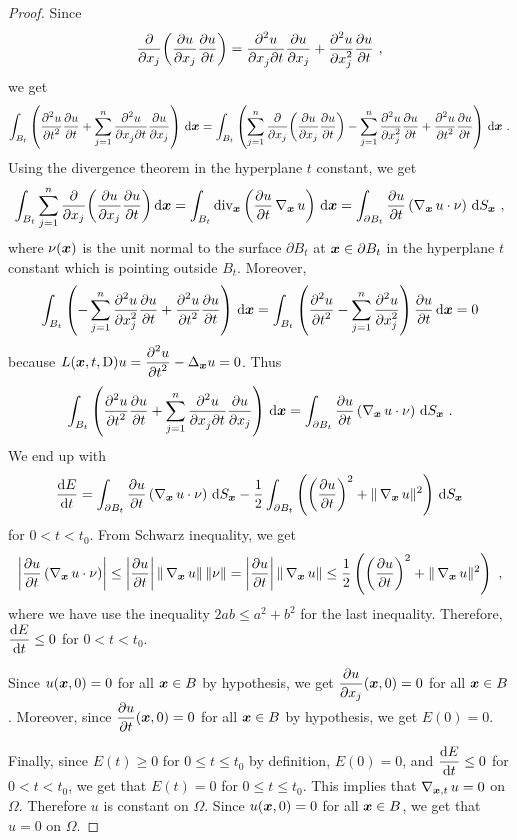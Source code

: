 \begin{proof}
Since
\[
\pdfdx{ \left( \pdydx{u}{x_j} \pdydx{u}{t} \right) }{x_j}
= \pdydxnm{u}{x_j}{t}{2}{}{} \pdydx{u}{x_j} + \pdydxn{u}{x_j}{2}
\pdydx{u}{t} \ ,
\]
we get
\[
\int_{B_t} \left( \pdydxn{u}{t}{2} \pdydx{u}{t} +
\sum_{j=1}^n \pdydxnm{u}{x_j}{t}{2}{}{} \pdydx{u}{x_j} \right)
\dx{\VEC{x}}
= \int_{B_t} \left( \sum_{j=1}^n
\pdfdx{ \left( \pdydx{u}{x_j} \pdydx{u}{t} \right) }{x_j}
- \sum_{j=1}^n \pdydxn{u}{x_j}{2} \pdydx{u}{t} + 
\pdydxn{u}{t}{2} \pdydx{u}{t} \right) \dx{\VEC{x}} \ .
\]
Using the divergence theorem in the hyperplane $t$ constant, we get
\[
\int_{B_t} \sum_{j=1}^n
\pdfdx{ \left( \pdydx{u}{x_j} \pdydx{u}{t} \right) }{x_j} \dx{\VEC{x}}
= \int_{B_t} \diV_\VEC{x} \left( \pdydx{u}{t} \graD_{\VEC{x}} u \right)
\dx{\VEC{x}}
= \int_{\partial B_t} \pdydx{u}{t} \left( \graD_{\VEC{x}} u \cdot
\nu \right) \dss{S}{x} \  ,
\]
where $\nu(\VEC{x})$ is the unit normal to the surface
$\partial B_t$ at $\VEC{x} \in \partial B_t$ in the hyperplane $t$
constant which is pointing outside $B_t$.
Moreover,
\[
\int_{B_t} \left( - \sum_{j=1}^n \pdydxn{u}{x_j}{2} \pdydx{u}{t} + 
\pdydxn{u}{t}{2} \pdydx{u}{t} \right) \dx{\VEC{x}} =
\int_{B_t} \left( \pdydxn{u}{t}{2} -
\sum_{j=1}^n \pdydxn{u}{x_j}{2} \right) \pdydx{u}{t} \dx{\VEC{x}} = 0
\]
because
$\displaystyle L(\VEC{x},t,\diff) u = \pdydxn{u}{t}{2} -
\Delta_{\VEC{x}} u = 0$.
Thus
\[
\int_{B_t} \left( \pdydxn{u}{t}{2} \pdydx{u}{t} +
\sum_{j=1}^n \pdydxnm{u}{x_j}{t}{2}{}{} \pdydx{u}{x_j} \right)
\dx{\VEC{x}} =
\int_{\partial B_t} \pdydx{u}{t} \left( \graD_{\VEC{x}} u \cdot
\nu \right) \dss{S}{x} \ .
\]
We end up with
\[
\dydx{E}{t} = \int_{\partial B_t} \pdydx{u}{t} \left( \graD_{\VEC{x}} u \cdot
\nu \right) \dss{S}{x}
- \frac{1}{2} \int_{\partial B_t} \left( \left(\pdydx{u}{t}\right)^2 
+ \|\graD_{\VEC{x}} u \|^2 \right)\dss{S}{x}
\]
for $0 <t < t_0$.  From Schwarz inequality, we get
\[
\left| \pdydx{u}{t} \left(\graD_{\VEC{x}} u \cdot \nu \right) \right|
 \leq \left| \pdydx{u}{t} \right| \| \graD_{\VEC{x}} u \|\,\|\nu\|
= \left| \pdydx{u}{t} \right| \| \graD_{\VEC{x}} u \|
\leq \frac{1}{2} \left( \left(\pdydx{u}{t}\right)^2 +
\|\graD_{\VEC{x}} u \|^2 \right) \ ,
\]
where we have use the inequality $2ab \leq a^2 + b^2$ for the last
inequality.  Therefore,
$\displaystyle \dydx{E}{t} \leq 0$ for $0 <t < t_0$.

Since $u(\VEC{x},0)=0$ for all $\VEC{x} \in B$ by hypothesis, we get
$\displaystyle \pdydx{u}{x_j}(\VEC{x},0) = 0$ for all $\VEC{x} \in B$.
Moreover, since $\displaystyle \pdydx{u}{t}(\VEC{x},0)=0$ for all
$\VEC{x} \in B$ by hypothesis, we get $E(0)=0$.

Finally, since $E(t) \geq 0$ for $0 \leq t \leq t_0$ by definition,
$E(0) = 0$, and $\displaystyle \dydx{E}{t} \leq 0$ for $0 <t < t_0$,
we get that $E(t) = 0$ for $0 \leq t \leq t_0$.  This implies that
$\graD_{\VEC{x},t} u = 0$ on $\Omega$.  Therefore $u$ is constant on
$\Omega$.  Since $u(\VEC{x},0)=0$ for all $\VEC{x} \in B$, we get that
$u=0$ on $\Omega$.
\end{proof}

